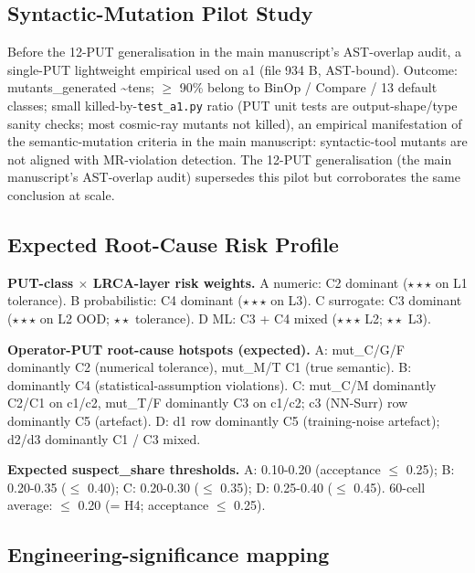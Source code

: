 \documentclass[manuscript,screen,review]{acmart}
\begin{document}
\subsection{Syntactic-Mutation Pilot Study}\label{b.3-cosmic-ray-a1-single-put-pilot-pre-12-put-empirical}

Before the 12-PUT generalisation in the main manuscript's AST-overlap audit, a single-PUT lightweight
empirical used  on a1 (file
934 B, AST-bound). Outcome: mutants\_generated \textasciitilde tens; $\geq$
90\% belong to BinOp / Compare / 13 default classes; small
killed-by-\texttt{test\_a1.py} ratio (PUT unit tests are
output-shape/type sanity checks; most cosmic-ray mutants not killed), an
empirical manifestation of the semantic-mutation criteria in the main manuscript: syntactic-tool mutants
are not aligned with MR-violation detection. The 12-PUT generalisation
(the main manuscript's AST-overlap audit) supersedes this pilot but corroborates the same conclusion at
scale.

\subsection{Expected Root-Cause Risk Profile}\label{b.4-expected-lrca-risk-profile}

\textbf{PUT-class $\times$ LRCA-layer risk weights.} A numeric: C2 dominant
($\star\star\star$ on L1 tolerance). B probabilistic: C4 dominant ($\star\star\star$ on L3). C
surrogate: C3 dominant ($\star\star\star$ on L2 OOD; $\star\star$ tolerance). D ML: C3 + C4
mixed ($\star\star\star$ L2; $\star\star$ L3).

\textbf{Operator-PUT root-cause hotspots (expected).} A: mut\_C/G/F
dominantly C2 (numerical tolerance), mut\_M/T C1 (true semantic). B:
dominantly C4 (statistical-assumption violations). C: mut\_C/M
dominantly C2/C1 on c1/c2, mut\_T/F dominantly C3 on c1/c2; c3 (NN-Surr)
row dominantly C5 (artefact). D: d1 row dominantly C5 (training-noise
artefact); d2/d3 dominantly C1 / C3 mixed.

\textbf{Expected suspect\_share thresholds.} A: 0.10-0.20 (acceptance $\leq$
0.25); B: 0.20-0.35 ($\leq$ 0.40); C: 0.20-0.30 ($\leq$ 0.35); D: 0.25-0.40 ($\leq$
0.45). 60-cell average: $\leq$ 0.20 (= H4; acceptance $\leq$ 0.25).

\subsection{Engineering-significance mapping}\label{b.5-engineering-significance-mapping}
\end{document}
